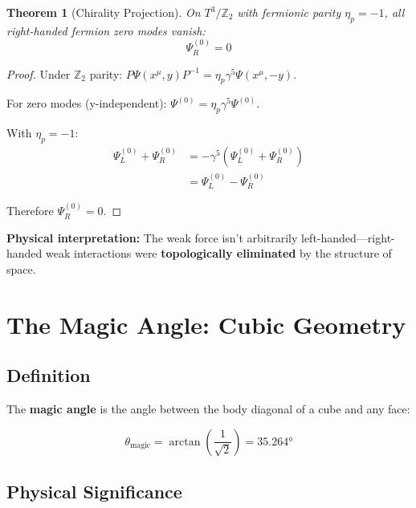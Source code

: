 \documentclass[12pt,a4paper]{article}
\newtheorem{theorem}{Theorem}[section]
\newcommand{\Ztwo}{\mathbb{Z}_2}
\newcommand{\Tthree}{T^3}
\begin{document}
\begin{theorem}[Chirality Projection]
On $\Tthree/\Ztwo$ with fermionic parity $\eta_p = -1$, all right-handed fermion zero modes vanish:
\begin{equation}
\boxed{\Psi_R^{(0)} = 0}
\end{equation}
\end{theorem}

\begin{proof}
Under $\Ztwo$ parity: $P\Psi(x^\mu, y)P^{-1} = \eta_p \gamma^5 \Psi(x^\mu, -y)$.

For zero modes (y-independent): $\Psi^{(0)} = \eta_p \gamma^5 \Psi^{(0)}$.

With $\eta_p = -1$:
\begin{align}
\Psi_L^{(0)} + \Psi_R^{(0)} &= -\gamma^5(\Psi_L^{(0)} + \Psi_R^{(0)}) \\
&= \Psi_L^{(0)} - \Psi_R^{(0)}
\end{align}

Therefore $\Psi_R^{(0)} = 0$.
\end{proof}

\textbf{Physical interpretation:} The weak force isn't arbitrarily left-handed---right-handed weak interactions were \textbf{topologically eliminated} by the structure of space.

\section{The Magic Angle: Cubic Geometry}
\label{sec:magic}

\subsection{Definition}

The \textbf{magic angle} is the angle between the body diagonal of a cube and any face:

\begin{equation}
\boxed{\theta_{\text{magic}} = \arctan\left(\frac{1}{\sqrt{2}}\right) = 35.264°}
\end{equation}

\subsection{Physical Significance}
\end{document}
